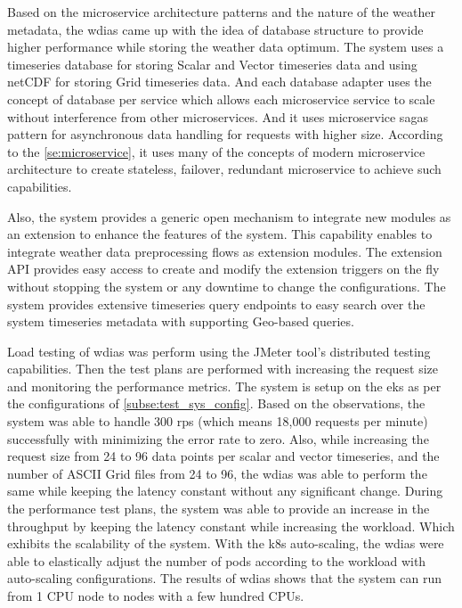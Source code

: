 Based on the microservice architecture patterns and the nature of the weather metadata, the \acrshort{wdias} came up with the idea of database structure to provide higher performance while storing the weather data optimum. The system uses a timeseries database for storing Scalar and Vector timeseries data and using \acrshort{netCDF} for storing Grid timeseries data. And each database adapter uses the concept of database per service which allows each microservice service to scale without interference from other microservices.
And it uses microservice sagas pattern for asynchronous data handling for requests with higher size. According to the \cref{se:microservice}, it uses many of the concepts of modern microservice architecture to create stateless, failover, redundant microservice to achieve such capabilities.

Also, the system provides a generic open mechanism to integrate new modules as an extension to enhance the features of the system. This capability enables to integrate weather data preprocessing flows as extension modules.
The extension API provides easy access to create and modify the extension triggers on the fly without stopping the system or any downtime to change the configurations.
The system provides extensive timeseries query endpoints to easy search over the system timeseries metadata with supporting Geo-based queries.

Load testing of \acrshort{wdias} was perform using the  JMeter tool's distributed testing capabilities. Then the test plans are performed with increasing the request size and monitoring the performance metrics. The system is setup on the \acrfull{eks} as per the configurations of \cref{subse:test_sys_config}. Based on the observations, the system was able to handle 300 \acrshort{rps} (which means 18,000 requests per minute) successfully with minimizing the error rate to zero. Also, while increasing the request size from 24 to 96 data points per scalar and vector timeseries, and the number of ASCII Grid files from 24 to 96, the \acrshort{wdias} was able to perform the same while keeping the latency constant without any significant change. During the performance test plans, the system was able to provide an increase in the throughput by keeping the latency constant while increasing the workload. Which exhibits the scalability of the system.
With the \acrshort{k8s} auto-scaling, the \acrshort{wdias} were able to elastically adjust the number of pods according to the workload with auto-scaling configurations. 
The results of \acrshort{wdias} shows that the system can run from 1 CPU node to nodes with a few hundred CPUs.